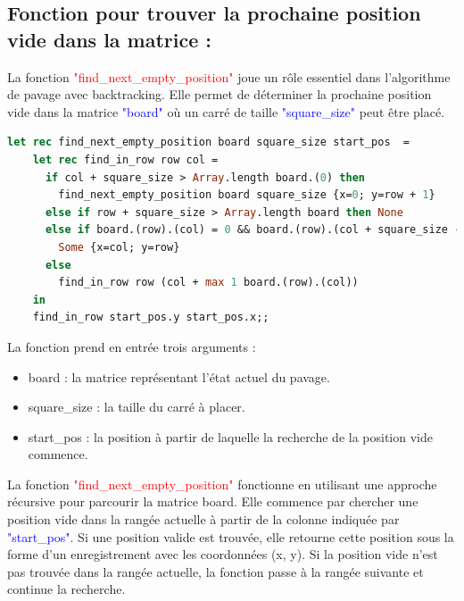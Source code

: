 \documentclass{article}
\begin{document}
\subsection{ Fonction pour trouver la prochaine position vide dans la matrice :}

La fonction \textcolor{red}{"find\_next\_empty\_position"} joue un rôle essentiel dans l'algorithme de pavage avec backtracking. Elle permet de déterminer la prochaine position vide dans la matrice \textcolor{blue}{"board"} où un carré de taille \textcolor{blue}{"square\_size"} peut être placé.\newline

\begin{lstlisting}[language=Caml]
let rec find_next_empty_position board square_size start_pos  =
    let rec find_in_row row col =
      if col + square_size > Array.length board.(0) then
        find_next_empty_position board square_size {x=0; y=row + 1}
      else if row + square_size > Array.length board then None
      else if board.(row).(col) = 0 && board.(row).(col + square_size - 1) = 0 && board.(row + square_size - 1).(col) = 0 && board.(row + square_size - 1).(col + square_size - 1) = 0 then
        Some {x=col; y=row}
      else
        find_in_row row (col + max 1 board.(row).(col))
    in
    find_in_row start_pos.y start_pos.x;;
\end{lstlisting}

La fonction prend en entrée trois arguments :
\begin{itemize}
  \item board : la matrice représentant l'état actuel du pavage.
  \item square\_size : la taille du carré à placer.
  \item start\_pos : la position à partir de laquelle la recherche de la position vide commence.\newline
\end{itemize}
    
    
    

La fonction \textcolor{red}{"find\_next\_empty\_position"} fonctionne en utilisant une approche récursive pour parcourir la matrice board. Elle commence par chercher une position vide dans la rangée actuelle à partir de la colonne indiquée par \textcolor{blue}{"start\_pos"}. Si une position valide est trouvée, elle retourne cette position sous la forme d'un enregistrement avec les coordonnées (x, y). Si la position vide n'est pas trouvée dans la rangée actuelle, la fonction passe à la rangée suivante et continue la recherche.\newline
\end{document}
